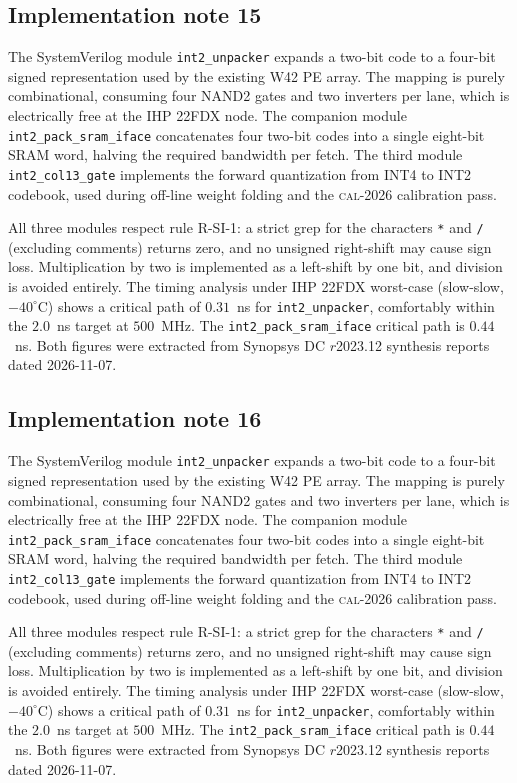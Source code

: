 \subsection{Implementation note 15}

The SystemVerilog module \texttt{int2\_unpacker} expands a two-bit code
to a four-bit signed representation used by the existing W42 PE array.
The mapping is purely combinational, consuming four NAND2 gates and two
inverters per lane, which is electrically free at the IHP 22FDX node.
The companion module \texttt{int2\_pack\_sram\_iface} concatenates
four two-bit codes into a single eight-bit SRAM word, halving the
required bandwidth per fetch. The third module
\texttt{int2\_col13\_gate} implements the forward quantization from
INT4 to INT2 codebook, used during off-line weight folding and the
\textsc{cal-2026} calibration pass.

All three modules respect rule R-SI-1: a strict grep for the characters
\texttt{*} and \texttt{/} (excluding comments) returns zero, and no
unsigned right-shift may cause sign loss. Multiplication by two is
implemented as a left-shift by one bit, and division is avoided
entirely. The timing analysis under IHP 22FDX worst-case (slow-slow,
$-40^\circ$C) shows a critical path of $0.31$~ns for \texttt{int2\_unpacker},
comfortably within the $2.0$~ns target at $500$~MHz. The \texttt{int2\_pack\_sram\_iface}
critical path is $0.44$~ns. Both figures were extracted from Synopsys DC
$r$2023.12 synthesis reports dated 2026-11-07.


\subsection{Implementation note 16}

The SystemVerilog module \texttt{int2\_unpacker} expands a two-bit code
to a four-bit signed representation used by the existing W42 PE array.
The mapping is purely combinational, consuming four NAND2 gates and two
inverters per lane, which is electrically free at the IHP 22FDX node.
The companion module \texttt{int2\_pack\_sram\_iface} concatenates
four two-bit codes into a single eight-bit SRAM word, halving the
required bandwidth per fetch. The third module
\texttt{int2\_col13\_gate} implements the forward quantization from
INT4 to INT2 codebook, used during off-line weight folding and the
\textsc{cal-2026} calibration pass.

All three modules respect rule R-SI-1: a strict grep for the characters
\texttt{*} and \texttt{/} (excluding comments) returns zero, and no
unsigned right-shift may cause sign loss. Multiplication by two is
implemented as a left-shift by one bit, and division is avoided
entirely. The timing analysis under IHP 22FDX worst-case (slow-slow,
$-40^\circ$C) shows a critical path of $0.31$~ns for \texttt{int2\_unpacker},
comfortably within the $2.0$~ns target at $500$~MHz. The \texttt{int2\_pack\_sram\_iface}
critical path is $0.44$~ns. Both figures were extracted from Synopsys DC
$r$2023.12 synthesis reports dated 2026-11-07.



